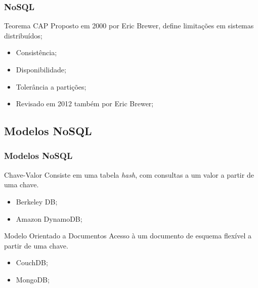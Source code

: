 \documentclass[brazil]{beamer}
\begin{document}
\begin{frame}
	\frametitle{NoSQL}
	\begin{block}{Teorema CAP}
	Proposto em 2000 por Eric Brewer, define limitações em sistemas distribuídos;
	\begin{itemize}
		\item Consistência;
		\item Disponibilidade;
		\item Tolerância a partições;
		\bigskip
		\item Revisado em 2012 também por Eric Brewer;
	\end{itemize}
	\end{block}
\end{frame}

\subsection{Modelos NoSQL}
\begin{frame}
	\frametitle{Modelos NoSQL}
	
	\begin{block}{Chave-Valor}
		Consiste em uma tabela \emph{hash}, com consultas a um valor a partir de uma chave.
		\begin{itemize}
			\item Berkeley DB;
			\item Amazon DynamoDB;
		\end{itemize}
	\end{block}

	\begin{block}{Modelo Orientado a Documentos}
		Acesso à um documento de esquema flexível a partir de uma chave.
	
		\begin{itemize}
			\item CouchDB;
			\item MongoDB;
		\end{itemize}
	\end{block}

\end{frame}
\end{document}

